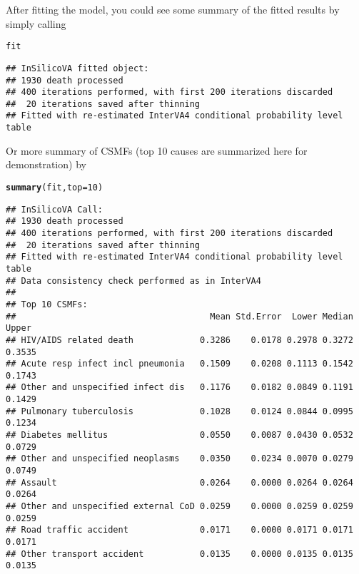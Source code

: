 \documentclass{article}\usepackage[]{graphicx}\usepackage[]{color}
\makeatletter
\newcommand{\hlnum}[1]{\textcolor[rgb]{0.686,0.059,0.569}{#1}}%
\newcommand{\hlstd}[1]{\textcolor[rgb]{0.345,0.345,0.345}{#1}}%
\newcommand{\hlkwc}[1]{\textcolor[rgb]{0.333,0.667,0.333}{#1}}%
\newcommand{\hlkwd}[1]{\textcolor[rgb]{0.737,0.353,0.396}{\textbf{#1}}}%
\newenvironment{kframe}{%
 \def\at@end@of@kframe{}%
 \ifinner\ifhmode%
  \def\at@end@of@kframe{\end{minipage}}%
  \begin{minipage}{\columnwidth}%
 \fi\fi%
 \def\FrameCommand##1{\hskip\@totalleftmargin \hskip-\fboxsep
 \colorbox{shadecolor}{##1}\hskip-\fboxsep
     \hskip-\linewidth \hskip-\@totalleftmargin \hskip\columnwidth}%
 \MakeFramed {\advance\hsize-\width
   \@totalleftmargin\z@ \linewidth\hsize
   \@setminipage}}%
 {\par\unskip\endMakeFramed%
 \at@end@of@kframe}
\newenvironment{knitrout}{}{} %
\makeatother
\begin{document}
After fitting the model, you could see some summary of the fitted results by simply calling

\begin{knitrout}
\color{fgcolor}\begin{kframe}
\begin{alltt}
\hlstd{fit}
\end{alltt}
\begin{verbatim}
## InSilicoVA fitted object:
## 1930 death processed
## 400 iterations performed, with first 200 iterations discarded
##  20 iterations saved after thinning
## Fitted with re-estimated InterVA4 conditional probability level table
\end{verbatim}
\end{kframe}
\end{knitrout}

Or more summary of CSMFs (top 10 causes are summarized here for demonstration) by
\begin{knitrout}
\color{fgcolor}\begin{kframe}
\begin{alltt}
\hlkwd{summary}\hlstd{(fit,} \hlkwc{top} \hlstd{=} \hlnum{10}\hlstd{)}
\end{alltt}
\begin{verbatim}
## InSilicoVA Call: 
## 1930 death processed
## 400 iterations performed, with first 200 iterations discarded
##  20 iterations saved after thinning
## Fitted with re-estimated InterVA4 conditional probability level table
## Data consistency check performed as in InterVA4 
## 
## Top 10 CSMFs:
##                                      Mean Std.Error  Lower Median  Upper
## HIV/AIDS related death             0.3286    0.0178 0.2978 0.3272 0.3535
## Acute resp infect incl pneumonia   0.1509    0.0208 0.1113 0.1542 0.1743
## Other and unspecified infect dis   0.1176    0.0182 0.0849 0.1191 0.1429
## Pulmonary tuberculosis             0.1028    0.0124 0.0844 0.0995 0.1234
## Diabetes mellitus                  0.0550    0.0087 0.0430 0.0532 0.0729
## Other and unspecified neoplasms    0.0350    0.0234 0.0070 0.0279 0.0749
## Assault                            0.0264    0.0000 0.0264 0.0264 0.0264
## Other and unspecified external CoD 0.0259    0.0000 0.0259 0.0259 0.0259
## Road traffic accident              0.0171    0.0000 0.0171 0.0171 0.0171
## Other transport accident           0.0135    0.0000 0.0135 0.0135 0.0135
\end{verbatim}
\end{kframe}
\end{knitrout}
\end{document}

